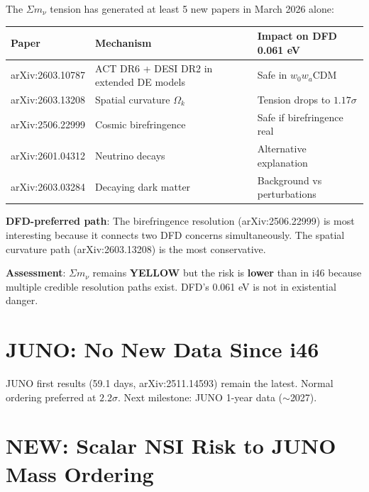 \documentclass[11pt,a4paper]{article}
\newcommand{\YELLOW}{\textcolor{dfdyellow}{\textbf{YELLOW}}}
\newcommand{\NEW}{\textcolor{dfdblue}{\textbf{NEW}}}
\begin{document}
\begin{tcolorbox}[colback=yellow!5!white, colframe=yellow!60!black,
  title={$\Sigma m_\nu$ Tension: March 2026 Paper Explosion}]

The $\Sigma m_\nu$ tension has generated at least 5 new papers in March 2026 alone:

\begin{center}
\begin{tabular}{lp{5cm}p{4cm}}
\toprule
\textbf{Paper} & \textbf{Mechanism} & \textbf{Impact on DFD 0.061 eV} \\
\midrule
arXiv:2603.10787 & ACT DR6 + DESI DR2 in extended DE models & Safe in $w_0 w_a$CDM \\
arXiv:2603.13208 & Spatial curvature $\Omega_k$ & Tension drops to $1.17\sigma$ \\
arXiv:2506.22999 & Cosmic birefringence & Safe if birefringence real \\
arXiv:2601.04312 & Neutrino decays & Alternative explanation \\
arXiv:2603.03284 & Decaying dark matter & Background vs perturbations \\
\bottomrule
\end{tabular}
\end{center}

\textbf{DFD-preferred path}: The birefringence resolution (arXiv:2506.22999) is most interesting because it connects two DFD concerns simultaneously. The spatial curvature path (arXiv:2603.13208) is the most conservative.

\textbf{Assessment}: $\Sigma m_\nu$ remains \YELLOW{} but the risk is \textbf{lower} than in i46 because multiple credible resolution paths exist. DFD's 0.061 eV is not in existential danger.
\end{tcolorbox}

\section{JUNO: No New Data Since i46}

JUNO first results (59.1 days, arXiv:2511.14593) remain the latest. Normal ordering preferred at $2.2\sigma$. Next milestone: JUNO 1-year data ($\sim$2027).

\section{\NEW: Scalar NSI Risk to JUNO Mass Ordering}
\end{document}
